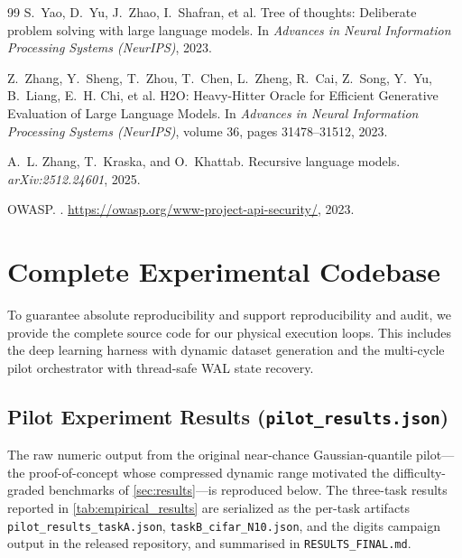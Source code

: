 \documentclass[conference]{IEEEtran}
\begin{document}
\begin{thebibliography}{99}
S.~Yao, D.~Yu, J.~Zhao, I.~Shafran, et al.
\newblock Tree of thoughts: Deliberate problem solving with large language models.
\newblock In \emph{Advances in Neural Information Processing Systems (NeurIPS)}, 2023.

Z.~Zhang, Y.~Sheng, T.~Zhou, T.~Chen, L.~Zheng, R.~Cai, Z.~Song, Y.~Yu, B.~Liang, E.~H. Chi, et al.
\newblock H2O: Heavy-Hitter Oracle for Efficient Generative Evaluation of Large Language Models.
\newblock In \emph{Advances in Neural Information Processing Systems (NeurIPS)}, volume 36, pages 31478--31512, 2023.

A.~L. Zhang, T.~Kraska, and O.~Khattab.
\newblock Recursive language models.
\newblock \emph{arXiv:2512.24601}, 2025.

OWASP.
.
\newblock \url{https://owasp.org/www-project-api-security/}, 2023.

\end{thebibliography}


\newpage
\appendix
\section{Complete Experimental Codebase}

To guarantee absolute reproducibility and support reproducibility and audit, we provide the complete source code for our physical execution loops. This includes the deep learning harness with dynamic dataset generation and the multi-cycle pilot orchestrator with thread-safe WAL state recovery.

\subsection{Pilot Experiment Results (\texttt{pilot\_results.json})}
\label{app:pilot_results}
The raw numeric output from the original near-chance Gaussian-quantile pilot---the proof-of-concept whose compressed dynamic range motivated the difficulty-graded benchmarks of \cref{sec:results}---is reproduced below. The three-task results reported in \cref{tab:empirical_results} are serialized as the per-task artifacts \texttt{pilot\_results\_taskA.json}, \texttt{taskB\_cifar\_N10.json}, and the digits campaign output in the released repository, and summarised in \texttt{RESULTS\_FINAL.md}.
\end{document}

